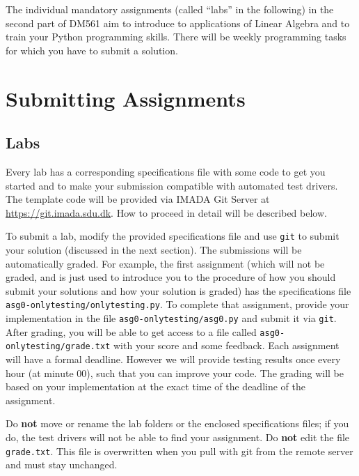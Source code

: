 
The individual mandatory assignments (called ``labs'' in the following) in the second part of DM561 aim to introduce to applications of Linear Algebra and to train your Python programming skills. There will be weekly programming tasks for which you have to submit a solution.

\section*{Submitting Assignments} %

\subsection*{Labs}

Every lab has a corresponding specifications file with some code to get you started and to make your submission compatible with automated test drivers. The template code will be provided via IMADA Git Server at \url{https://git.imada.sdu.dk}. How to proceed in detail will be described below.


To submit a lab, modify the provided specifications file and use \texttt{git} to submit your solution (discussed in the next section).
The submissions will be automatically graded. 
For example, the first assignment (which will not be graded, and is just used to introduce you to the procedure of how you should submit your solutions and how your solution is graded) has the specifications file \texttt{asg0-onlytesting/onlytesting.py}.
To complete that assignment, provide your implementation in the file \texttt{asg0-onlytesting/asg0.py} and submit it via \texttt{git}.
After grading, you will be able to get access to a file called \texttt{asg0-onlytesting/grade.txt} with your score and some feedback. Each assignment will have a formal deadline. However we will provide testing results once every hour (at minute 00), such that you can improve your code. The grading will be based on your implementation at the exact time of the deadline of the assignment.


\begin{warn}
Do \textbf{not} move or rename the lab folders or the enclosed
specifications files; if you do, the test drivers will not be able to
find your assignment. Do \textbf{not} edit the file
\texttt{grade.txt}. This file is overwritten when you pull with git from
the remote server and must stay unchanged. 
\end{warn}


